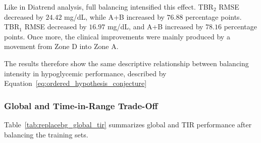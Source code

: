 Like in Diatrend analysis, full balancing intensified this effect. TBR$_2$ RMSE decreased by \(24.42\) mg/dL, while A+B increased by \(76.88\) percentage points. TBR$_1$ RMSE decreased by \(16.97\) mg/dL, and A+B increased by \(78.16\) percentage points. Once more, the clinical improvements were mainly produced by a movement from Zone D into Zone A.

The results therefore show the same descriptive relationship between balancing intensity in hypoglycemic performance, described by Equation~\ref{eq:ordered_hypothesis_conjecture}

\subsubsection{Global and Time-in-Range Trade-Off}
\label{subsubsec:replacebg_global_tir}

Table~\ref{tab:replacebg_global_tir} summarizes global and TIR performance after balancing the training sets.

\begin{table}[htbp]
    \centering
    \caption{Aggregate global and TIR performance in REPLACE-BG,
    averaged across balancing methods.}
    \label{tab:replacebg_global_tir}
\end{table}

